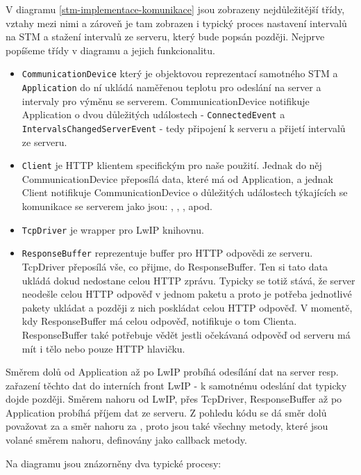 V diagramu \ref{stm-implementace-komunikace} jsou zobrazeny nejdůležitější třídy, vztahy
mezi nimi a zároveň je tam zobrazen i typický proces nastavení intervalů na STM a stažení
intervalů ze serveru, který bude popsán později.
Nejprve popíšeme třídy v diagramu a jejich funkcionalitu.
\begin{itemize}
  \item \texttt{CommunicationDevice} který je objektovou reprezentací samotného STM a \texttt{Application}
    do ní ukládá naměřenou teplotu pro odeslání na server a intervaly pro výměnu se serverem.
    CommunicationDevice notifikuje Application o dvou důležitých událostech - \texttt{ConnectedEvent} a
    \texttt{IntervalsChangedServerEvent} - tedy připojení k serveru a přijetí intervalů ze serveru.
  \item \texttt{Client} je HTTP klientem specifickým pro naše použití. Jednak do něj CommunicationDevice
    přeposílá data, které má od Application, a jednak Client notifikuje CommunicationDevice o
    důležitých událostech týkajících se komunikace se serverem jako jsou: ,
    , , apod.
  \item \texttt{TcpDriver} je wrapper pro LwIP knihovnu.
  \item \texttt{ResponseBuffer} reprezentuje buffer pro HTTP odpovědi ze serveru.
    TcpDriver přeposílá vše, co přijme, do ResponseBuffer.
    Ten si tato data ukládá dokud nedostane celou HTTP zprávu.
    Typicky se totiž stává, že server neodešle celou HTTP odpověď v jednom paketu a proto je potřeba
    jednotlivé pakety ukládat a později z nich poskládat celou HTTP odpověď.
    V momentě, kdy ResponseBuffer má celou odpověď, notifikuje o tom Clienta.
    ResponseBuffer také potřebuje vědět jestli očekávaná odpověď od serveru má mít i tělo nebo pouze
    HTTP hlavičku.
\end{itemize}

Směrem dolů od Application až po LwIP probíhá odesílání dat na server resp. zařazení těchto dat
do interních front LwIP - k samotnému odeslání dat typicky dojde později.
Směrem nahoru od LwIP, přes TcpDriver, ResponseBuffer až po Application probíhá příjem dat
ze serveru.
Z pohledu kódu se dá směr dolů považovat za  a směr nahoru za , proto
jsou také všechny metody, které jsou volané směrem nahoru, definovány jako callback metody.

Na diagramu jsou znázorněny dva typické procesy:

